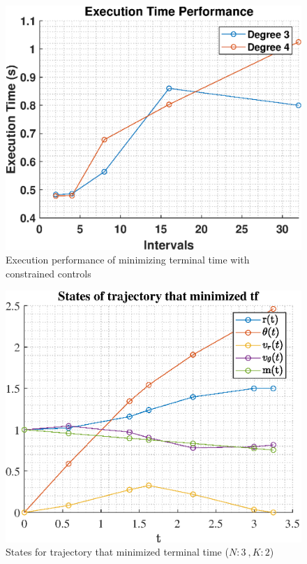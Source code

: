 \documentclass[]{article}
\begin{document}
	\begin{figure}
		\centering
		\includegraphics[scale=0.75]{runtime_c3_tf.eps}
		\caption{Execution performance of minimizing terminal time with constrained controls}
		\label{fig:runtime_c3_tf}
	\end{figure}
	\begin{figure}
		\centering
		\includegraphics[scale=0.75]{states_N3_K2_C3_tf.eps}
		\caption{States for trajectory that minimized terminal time (\(N:3\ , K:2\))}
		\label{fig:states_N3_K2_C3_tf}
	\end{figure}
\end{document}
